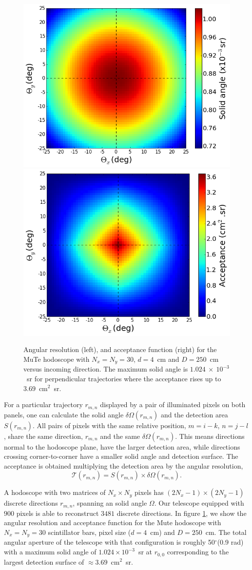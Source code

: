 \documentclass[letterpaper,11pt]{article}
\begin{document}
\begin{figure}[htb]
\centering
\includegraphics[width=0.48\columnwidth]{Figures/Solid_angle.png}
\includegraphics[width=0.48\columnwidth]{Figures/Aceptancia.png}
\caption{Angular resolution (left), and acceptance function (right) for the MuTe hodoscope with $N_x=N_y=30$, $d=4$~cm and $D=250$~cm versus incoming direction. The maximum solid angle is $1.024~\times~10^{-3}$~sr for perpendicular trajectories where the acceptance rises up to $3.69$~cm$^{2}$~sr.}
\label{fig:acceptance}
\end{figure}

For a particular trajectory $r_{m,n}$ displayed by a pair of illuminated pixels on both panels, one can calculate the solid angle $\delta\Omega(r_{m,n})$ and the detection area $S(r_{m,n})$. All pairs of pixels with the same relative position, {$m=i-k$, $n=j-l$}, share the same direction, $r_{m,n}$ and the same $\delta\Omega(r_{m,n})$. This means directions normal to the hodoscope plane, have the larger detection area, while directions crossing corner-to-corner have a smaller solid angle and detection surface. The acceptance is obtained \cite{LesparreEtal2010} multiplying the detection area by the angular resolution,
\begin{equation}
\mathcal{T}(r_{m,n})=S(r_{m,n})\times \delta\Omega(r_{m,n}).
\end{equation}

A hodoscope with two matrices of $N_x\times N_y$ pixels has $(2N_x-1)\times(2N_y-1)$ discrete directions $r_{m,n}$, spanning an solid angle $\Omega$. Our telescope equipped with $900$ pixels is able to reconstruct $3481$ discrete directions. In figure \ref{fig:acceptance}, we show the angular resolution and acceptance function for the Mute hodoscope with $N_x=N_y=30$ scintillator bars, pixel size ($d=4$~cm) and $D=250$~cm. The total angular aperture of the telescope with that configuration is roughly 50$^{\circ}$(0.9 rad) with a maximum solid angle of $1.024\times 10^{-3}$~sr at $r_{0,0}$ corresponding to the largest detection surface of $\approx 3.69$~cm$^{2}$~sr.
\end{document}
